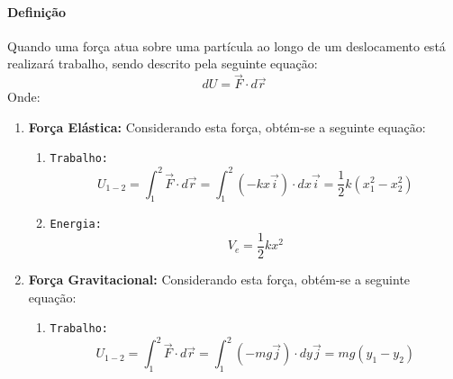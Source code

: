 \documentclass{article}
\begin{document}
            \paragraph{Definição}Quando uma força atua sobre uma partícula ao longo de um deslocamento está realizará trabalho, sendo descrito pela seguinte equação:
                \begin{equation}
                    \boxed{dU = \vec{F} \cdot d\vec{r}}
                \end{equation}
            Onde:
                \begin{enumerate}[noitemsep]
                    \item \textbf{Força Elástica:} Considerando esta força, obtém-se a seguinte equação:
                        \begin{enumerate}[noitemsep]
                            \item \texttt{Trabalho:}
                                \[
                                    \boxed{
                                        U_{1-2} = \int_{1}^{2} \vec{F} \cdot d\vec{r}
                                                = \int_{1}^{2} (-kx\vec{i})\cdot dx \vec{i}
                                                = \frac{1}{2} k (x_{1}^2 - x_{2}^2)
                                    }
                                \]
                            \item \texttt{Energia:}
                                \begin{equation}
                                    \boxed{
                                        V_{e} = \frac{1}{2} k x^{2}
                                    }
                                \end{equation}
                        \end{enumerate}
                    \item \textbf{Força Gravitacional:} Considerando esta força, obtém-se a seguinte equação:
                        \begin{enumerate}[noitemsep]
                            \item \texttt{Trabalho:}
                                \[
                                    \boxed{
                                        U_{1-2} = \int_{1}^{2} \vec{F} \cdot d\vec{r}
                                                = \int_{1}^{2} (-mg\vec{j})\cdot dy \vec{j}
                                                = mg (y_{1} - y_{2})
                                    }
                                \]

\end{enumerate}
\end{enumerate}
\end{document}
